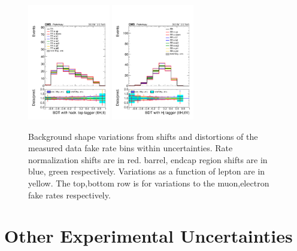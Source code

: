 \begin{figure}[htb]
        \includegraphics[width=0.32\textwidth]{ch10_figs/kinMVA_2lss_e_ttbar_withBDTv8.pdf}
        \includegraphics[width=0.32\textwidth]{ch10_figs/kinMVA_2lss_e_ttV_withHj.pdf}
        \caption{Background shape variations from shifts and distortions of the measured data fake rate bins within uncertainties. 
          Rate normalization shifts are in red. barrel, endcap region shifts are in blue, green respectively. Variations as a function
          of lepton \pt are in yellow. The top,bottom row is for variations to the muon,electron fake rates respectively.}
        \label{fig:FRvars_shape}
\end{figure}



\section{Other Experimental Uncertainties}




